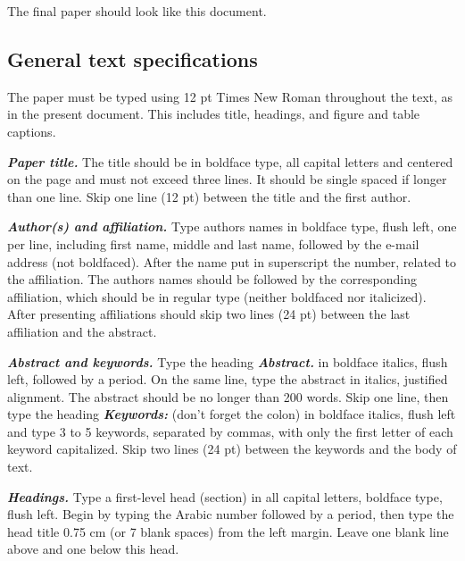 \documentclass[12pt,fleqn]{article}
\begin{document}
The final paper should look like this document.

\subsection{General text specifications}

The paper must be typed using 12 pt Times New Roman throughout the text, as in the present document. This includes title, headings, and figure and table captions.

\vspace{0.5cm} %

\textbf{\textit{Paper title.}} The title should be in boldface type, all capital letters and centered on the page and must not exceed three lines. It should be single spaced if longer than one line. Skip one line (12 pt) between the title and the first author.

\vspace{0.5cm} %

\textbf{\textit{Author(s) and affiliation.}} Type authors names in boldface type, flush left, one per line, including first name, middle and last name, followed by the e-mail address (not boldfaced). After the name put in superscript the number, related to the affiliation. The authors names should be followed by the corresponding affiliation, which should be in regular type (neither boldfaced nor italicized). After presenting affiliations should skip two lines (24 pt) between the last affiliation and the abstract.

\vspace{0.5cm} %

\textbf{\textit{Abstract and keywords.}} Type the heading \textbf{\textit{Abstract.}} in boldface italics, flush left, followed by a period. On the same line, type the abstract in italics, justified alignment. The abstract should be no longer than 200 words. Skip one line, then type the heading \textbf{\textit{Keywords:}} (don't forget the colon) in boldface italics, flush left and type 3 to 5 keywords, separated by commas, with only the first letter of each keyword capitalized. Skip two lines (24 pt) between the keywords and the body of text.

\vspace{0.5cm} %

\textbf{\textit{Headings.}} Type a first-level head (section) in all capital letters, boldface type, flush left. Begin by typing the Arabic number followed by a period, then type the head title 0.75 cm (or 7 blank spaces) from the left margin. Leave one blank line above and one below this head. 
\end{document}
